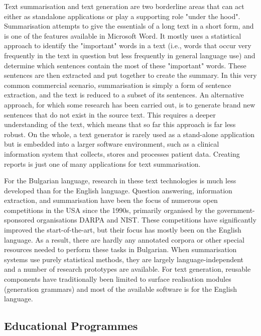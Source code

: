 \begin{multicols}{2}
Text summarisation and text generation are two borderline areas that can act either as standalone applications or play a supporting role "under the hood". Summarisation attempts to give the essentials of a long text in a short form, and is one of the features available in Microsoft Word. It mostly uses a statistical approach to identify the "important" words in a text (i.e., words that occur very frequently in the text in question but less frequently in general language use) and determine which sentences contain the most of these "important" words. These sentences are then extracted and put together to create the summary. In this very common commercial scenario, summarisation is simply a form of sentence extraction, and the text is reduced to a subset of its sentences. An alternative approach, for which some research has been carried out, is to generate brand new sentences that do not exist in the source text. This requires a deeper understanding of the text, which means that
  so far this approach is far less robust. On the whole, a text generator is rarely used as a stand-alone application but is embedded into a larger software environment, such as a clinical information system that collects, stores and processes patient data. Creating reports is just one of many applications for text summarisation. 

For the Bulgarian language, research in these text technologies is much less developed than for the English language. Question answering, information extraction, and summarisation have been the focus of numerous open competitions in the USA since the 1990s, primarily organised by the government-sponsored organisations DARPA and NIST. These competitions have significantly improved the start-of-the-art, but their focus has mostly been on the English language. As a result, there are hardly any annotated corpora or other special resources needed to perform these tasks in Bulgarian. When summarisation systems use purely statistical methods, they are largely language-independent and a number of research prototypes are available. For text generation, reusable components have traditionally been limited to surface realisation modules (generation grammars) and most of the available software is for the English language. 


\subsection{Educational Programmes}



\end{multicols}
